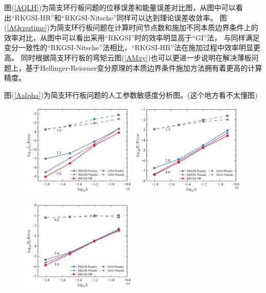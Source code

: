 图(\ref{AQLH})为简支环行板问题的位移误差和能量误差对比图，从图中可以看出“RKGSI-HR”和“RKGSI-Nitsche”同样可以达到理论误差收敛率。
图(\ref{AQcputime})为简支环行板问题在计算时间节点数和施加不同本质边界条件上的效率对比，从图中可以看出采用“RKGSI”时的效率明显高于“GI”法，
与同样满足变分一致性的“RKGSI-Nitsche”法相比，“RKGSI-HR”法在施加过程中效率明显更高。
同时根据简支环行板的弯矩云图(\ref{AMxy})也可以更进一步说明在解决薄板问题上，基于Hellinger-Reissner变分原理的本质边界条件施加方法拥有着更高的计算精度。\par
图(\ref{Aalpha})为简支环行板问题的人工参数敏感度分析图。(这个地方看不太懂图)
\begin{figure}[H]
    \centering
    \begin{subcaptiongroup}
    \includegraphics[width=0.49\textwidth]{figure/PHR/A/QL2.png}
    \label{QL2}
    \includegraphics[width=0.49\textwidth]{figure/PHR/A/QH1.png}
    \label{QH1}
    \end{subcaptiongroup}
    \begin{subcaptiongroup}
    \includegraphics[width=0.49\textwidth]{figure/PHR/A/QH2.png}

\end{subcaptiongroup}
\end{figure}
